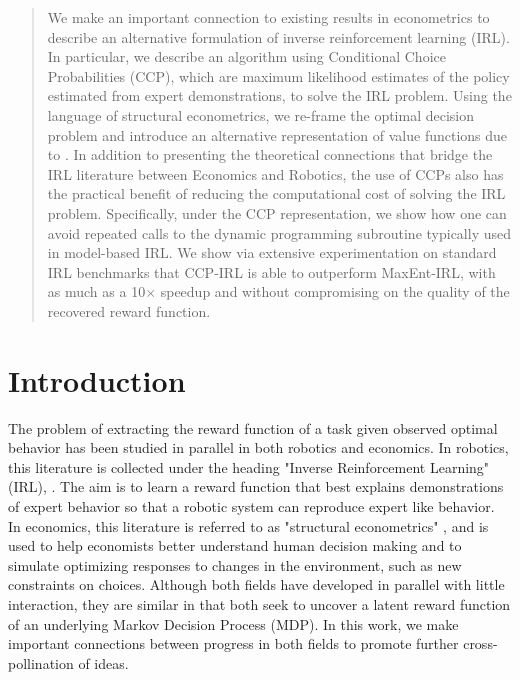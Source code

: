 \documentclass{article}
\begin{document}
\begin{abstract}
We make an important connection to existing results in econometrics to describe an alternative formulation of inverse reinforcement learning (IRL). In particular, we describe an algorithm using Conditional Choice Probabilities (CCP), which are maximum likelihood estimates of the policy estimated from expert demonstrations, to solve the IRL problem. Using the language of structural econometrics, we re-frame the optimal decision problem and introduce an alternative representation of value functions due to \cite{hotz}. In addition to presenting the theoretical connections that bridge the IRL literature between Economics and Robotics, the use of CCPs also has the practical benefit of reducing the computational cost of solving the IRL problem. Specifically, under the CCP representation, we show how one can avoid repeated calls to the dynamic programming subroutine typically used in model-based IRL. We show via extensive experimentation on standard IRL benchmarks that CCP-IRL is able to outperform MaxEnt-IRL, with as much as a 10$\times$ speedup and without compromising on the quality of the recovered reward function.
\end{abstract} 

\section{Introduction}

The problem of extracting the reward function of a task given observed optimal behavior has been studied in parallel in both robotics and economics. In robotics, this literature is collected under the heading "Inverse Reinforcement Learning" (IRL), \cite{Ng2000, abbeel2004apprenticeship}. The aim is to learn a reward function that best explains demonstrations of expert behavior so that a robotic system can reproduce expert like behavior. In economics, this literature is referred to as "structural econometrics" \cite{miller, pakes, rust_gmc, wolpin}, and is used to help economists better understand human decision making and to simulate optimizing responses to changes in the environment, such as new constraints on choices. Although both fields have developed in parallel with little interaction, they are similar in that both seek to uncover a latent reward function of an underlying Markov Decision Process (MDP). In this work, we make important connections between progress in both fields to promote further cross-pollination of ideas.

\end{document}
